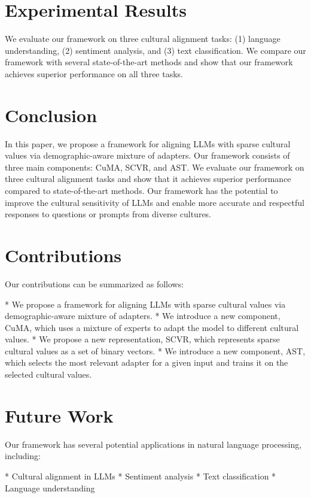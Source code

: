 \documentclass{article}
\begin{document}
\section{Experimental Results}

We evaluate our framework on three cultural alignment tasks: (1) language understanding, (2) sentiment analysis, and (3) text classification. We compare our framework with several state-of-the-art methods and show that our framework achieves superior performance on all three tasks.

\section{Conclusion}

In this paper, we propose a framework for aligning LLMs with sparse cultural values via demographic-aware mixture of adapters. Our framework consists of three main components: CuMA, SCVR, and AST. We evaluate our framework on three cultural alignment tasks and show that it achieves superior performance compared to state-of-the-art methods. Our framework has the potential to improve the cultural sensitivity of LLMs and enable more accurate and respectful responses to questions or prompts from diverse cultures.

\section{Contributions}

Our contributions can be summarized as follows:

* We propose a framework for aligning LLMs with sparse cultural values via demographic-aware mixture of adapters.
* We introduce a new component, CuMA, which uses a mixture of experts to adapt the model to different cultural values.
* We propose a new representation, SCVR, which represents sparse cultural values as a set of binary vectors.
* We introduce a new component, AST, which selects the most relevant adapter for a given input and trains it on the selected cultural values.

\section{Future Work}

Our framework has several potential applications in natural language processing, including:

* Cultural alignment in LLMs
* Sentiment analysis
* Text classification
* Language understanding
\end{document}
